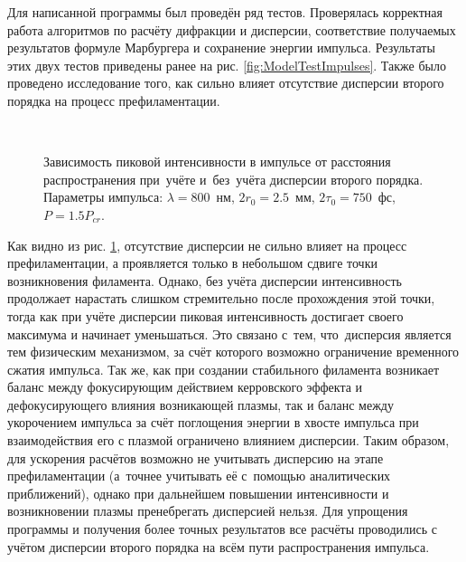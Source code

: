 Для написанной программы был проведён ряд тестов. Проверялась корректная работа алгоритмов по расчёту дифракции и дисперсии,
соответствие получаемых результатов формуле Марбургера и сохранение энергии импульса. Результаты этих двух тестов
приведены ранее на рис. \ref{fig:ModelTestImpulses}.
Также было проведено исследование того, как сильно влияет отсутствие дисперсии второго порядка на процесс префиламентации.


\begin{figure}[H]
    \begin{center}
        \begin{minipage}{\minipagewidthtwo}
        \end{minipage}
        \\[1ex]
        \caption{Зависимость пиковой интенсивности в импульсе от расстояния распространения при~учёте и~без~учёта дисперсии второго порядка.
                 Параметры импульса: $\lambda = 800$~нм, $2r_0 = 2.5$~мм, $2\tau_0 = 750$~фс, $P = 1.5 P_{cr}$.}
        \label{fig:PulsesNoYesIntensity}
    \end{center}
\end{figure}


Как видно из рис. \ref{fig:PulsesNoYesIntensity}, отсутствие дисперсии не сильно влияет на процесс префиламентации,
а проявляется только в небольшом сдвиге точки возникновения филамента. Однако, без учёта дисперсии интенсивность
продолжает нарастать слишком стремительно после прохождения этой точки, тогда как при учёте дисперсии
пиковая интенсивность достигает своего максимума и начинает уменьшаться. Это связано с~тем, что~дисперсия является
тем физическим механизмом, за счёт которого возможно ограничение временного сжатия импульса.
Так же, как при создании стабильного филамента возникает баланс между фокусирующим действием керровского эффекта
и дефокусирующего влияния возникающей плазмы, так и баланс между укорочением импульса за счёт поглощения энергии в хвосте импульса при взаимодействия его
с плазмой ограничено влиянием дисперсии. Таким образом, для ускорения расчётов возможно не учитывать дисперсию
на этапе префиламентации (а~точнее учитывать её с~помощью аналитических приближений), однако
при дальнейшем повышении интенсивности и возникновении плазмы пренебрегать дисперсией нельзя.
Для упрощения программы и получения более точных результатов все расчёты проводились
с учётом дисперсии второго порядка на всём пути распространения импульса.


